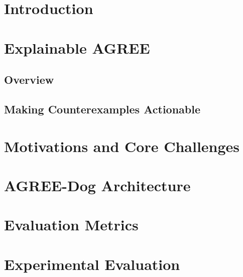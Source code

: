 \documentclass{llncs}
\begin{document}
\section{Introduction}
\label{sec:introduction}


\section{Explainable AGREE}
\label{sec:Explainable-AGREE}
\subsection{Overview}

\subsection{Making Counterexamples Actionable}
\label{sec:actionable}


\section{Motivations and Core Challenges}
\label{sec:motivations-core-challenges}

%


\section{AGREE-Dog Architecture}
\label{sec:design-architecture}



\section{Evaluation Metrics}
\label{sec:metrics}



%

\section{Experimental Evaluation}
\label{sec:key-impact}


%
\end{document}
